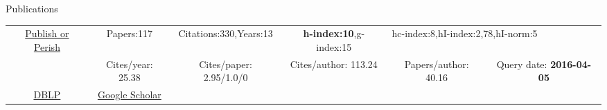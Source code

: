 \begin{rubrique}{Publications}

  {\footnotesize


    \begin{tabular}{|c||ccccc|}
      \hline
      \multirow{2}{4em}{\href{http://www.harzing.com/pop.htm}{Publish or Perish}}
      & Papers:117        & Citations:330,Years:13   & \textbf{h-index:10},g-index:15 & \multicolumn{2}{l|}{hc-index:8,hI-index:2,78,hI-norm:5}\\
      & Cites/year: 25.38 & Cites/paper: 2.95/1.0/0  & Cites/author: 113.24 & Papers/author: 40.16 & Query date: \textbf{2016-04-05}\\
      \hline
      \href{http://www.informatik.uni-trier.de/~ley/pers/hd/v/Varrette:S=eacute=bastien.html}{DBLP} &
                                                                                                      \multicolumn{1}{c|}{\href{https://scholar.google.fr/citations?hl=fr\&user=6PTStIcAAAAJ\&view_op=list_works\&sortby=pubdate}{Google Scholar}}\\
      \cline{1-2}
    \end{tabular}
  }
  ~\\[2em]



\end{rubrique}





%
